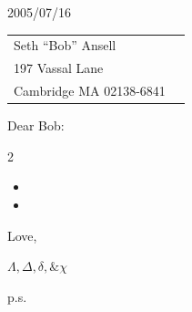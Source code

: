 \documentclass[11pt]{article}%
\def\docdate{2005/07/16}%
\begin{document}
\thispagestyle{first}

\docdate
\medskip

\begin{tabular*}{\columnwidth}{@{\extracolsep{\fill}}lr}%
  Seth ``Bob'' Ansell &\\
  197 Vassal Lane \\
  Cambridge MA 02138-6841
\end{tabular*}
\medskip

Dear Bob:

\begin{multicols}{2}

\lipsum[2-5]

\begin{itemize}
\item \lipsum[6]
\item \lipsum[7]
\end{itemize}

\lipsum[8-9]

\end{multicols}



Love,

{\large $\Lambda, \Delta, \delta, \& \chi$}

\vspace{3ex}

\begin{minipage}[c]{0.1\linewidth}p.s.\end{minipage}
\begin{minipage}[c]{0.9\linewidth}
\lipsum[10]%
\end{minipage}
\end{document}
